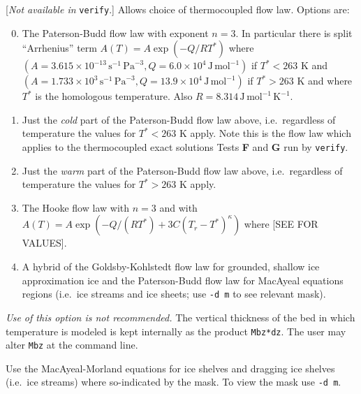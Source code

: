 \documentclass[final]{amsart}
\begin{document}
  [\emph{Not available in } \verb|verify|.]  Allows choice of thermocoupled flow law.  Options are:\renewcommand{\labelenumi}{\arabic{enumi}:~}\begin{enumerate}\setcounter{enumi}{-1}
\item The Paterson-Budd \cite{PatersonBudd} flow law with exponent $n=3$.  In particular there is split ``Arrhenius'' term $A(T) = A \exp(-Q/RT^*)$ where $(A = 3.615 \times 10^{-13}\, \text{s}^{-1}\, \text{Pa}^{-3}, Q = 6.0 \times 10^4\, \text{J}\, \text{mol}^{-1})$ if $T^* < 263$ K and $(A = 1.733 \times 10^{3}\, \text{s}^{-1}\, \text{Pa}^{-3}, Q = 13.9 \times 10^4\, \text{J}\, \text{mol}^{-1})$ if $T^* > 263$ K and where $T^*$ is the homologous temperature.  Also $R=8.314\, \text{J}\, \text{mol}^{-1}\, \text{K}^{-1}$.
\item Just the \emph{cold} part of the Paterson-Budd flow law above, i.e.~regardless of temperature the values for $T^*<263$ K apply.  Note this is the flow law which applies to the thermocoupled exact solutions Tests \textbf{F} and \textbf{G} run by \verb|verify|.
\item Just the \emph{warm} part of the Paterson-Budd flow law above, i.e.~regardless of temperature the values for $T^*>263$ K apply.
\item The Hooke flow law with $n=3$ and with $A(T) = A \exp(-Q/(RT^*) + 3C (T_r - T^*)^\kappa)$ where [SEE \cite{Hooke,PayneBaldwin} FOR VALUES]. 
\item A hybrid of the Goldsby-Kohlstedt flow law \cite{GoldsbyKohlstedt} for grounded, shallow ice approximation ice and the Paterson-Budd flow law for MacAyeal equations regions (i.e.~ice streams and ice sheets; use \verb|-d m| to see relevant mask).
\end{enumerate}

  \emph{Use of this option is not recommended.}  The vertical thickness of the bed in which temperature is modeled is kept internally as the product \verb|Mbz*dz|.  The user may alter \verb|Mbz| at the command line.






  Use the MacAyeal-Morland equations for ice shelves and dragging ice shelves (i.e.~ice streams) where so-indicated by the mask.  To view the mask use \verb|-d m|.
\end{document}
